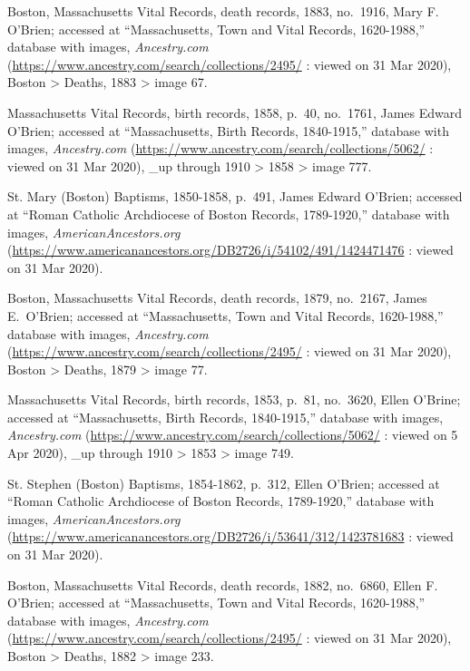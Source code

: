 \begin{thebibliography}{999}
	Boston, Massachusetts Vital Records, death records, 1883, no.\ 1916, Mary F. O'Brien; accessed at ``Massachusetts, Town and Vital Records, 1620-1988,'' database with images, \textit{Ancestry.com} (\url{https://www.ancestry.com/search/collections/2495/} : viewed on 31 Mar 2020), Boston > Deaths, 1883 > image 67.
	
	Massachusetts Vital Records, birth records, 1858, p.\ 40, no.\ 1761, James Edward O'Brien; accessed at ``Massachusetts, Birth Records, 1840-1915,'' database with images, \textit{Ancestry.com} (\url{https://www.ancestry.com/search/collections/5062/} : viewed on 31 Mar 2020), \_up through 1910 > 1858 > image 777.
	
	St. Mary (Boston) Baptisms, 1850-1858, p.\ 491, James Edward O'Brien; accessed at ``Roman Catholic Archdiocese of Boston Records, 1789-1920,'' database with images, \textit{AmericanAncestors.org} (\url{https://www.americanancestors.org/DB2726/i/54102/491/1424471476} : viewed on 31 Mar 2020).
	
	Boston, Massachusetts Vital Records, death records, 1879, no.\ 2167, James E.\ O'Brien; accessed at ``Massachusetts, Town and Vital Records, 1620-1988,'' database with images, \textit{Ancestry.com} (\url{https://www.ancestry.com/search/collections/2495/} : viewed on 31 Mar 2020), Boston > Deaths, 1879 > image 77.
	
	Massachusetts Vital Records, birth records, 1853, p.\ 81, no.\ 3620, Ellen O'Brine; accessed at ``Massachusetts, Birth Records, 1840-1915,'' database with images, \textit{Ancestry.com} (\url{https://www.ancestry.com/search/collections/5062/} : viewed on 5 Apr 2020), \_up through 1910 > 1853 > image 749.
	
	St. Stephen (Boston) Baptisms, 1854-1862, p.\ 312, Ellen O'Brien; accessed at ``Roman Catholic Archdiocese of Boston Records, 1789-1920,'' database with images, \textit{AmericanAncestors.org} (\url{https://www.americanancestors.org/DB2726/i/53641/312/1423781683} : viewed on 31 Mar 2020).
	
	Boston, Massachusetts Vital Records, death records, 1882, no.\ 6860, Ellen F. O'Brien; accessed at ``Massachusetts, Town and Vital Records, 1620-1988,'' database with images, \textit{Ancestry.com} (\url{https://www.ancestry.com/search/collections/2495/} : viewed on 31 Mar 2020), Boston > Deaths, 1882 > image 233.
	

\end{thebibliography}
